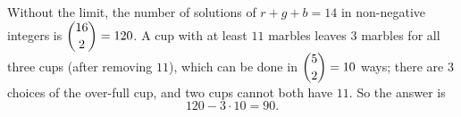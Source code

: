 Without the limit, the number of solutions of $r+g+b=14$ in non-negative integers is $\dbinom{16}{2}=120$. A cup with at least $11$ marbles leaves $3$ marbles for all three cups (after removing $11$), which can be done in $\dbinom{5}{2}=10$ ways; there are $3$ choices of the over-full cup, and two cups cannot both have $11$. So the answer is
\[120-3\cdot10=\boxed{90}.\]
